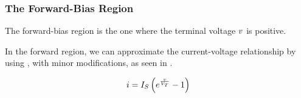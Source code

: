 \subsubsection{The Forward-Bias Region}\label{subsubsec:Diode_Forward-Bias_Region}
The forward-bias region is the one where the terminal voltage $v$ is positive.

In the forward region, we can approximate the current-voltage relationship by using , with minor modifications, as seen in .

\begin{equation}\label{eq:Diode_Forward-Bias-IV_Relationship}
  i = I_{S} \left( e^{\frac{v}{V_{T}}} - 1 \right)
\end{equation}


